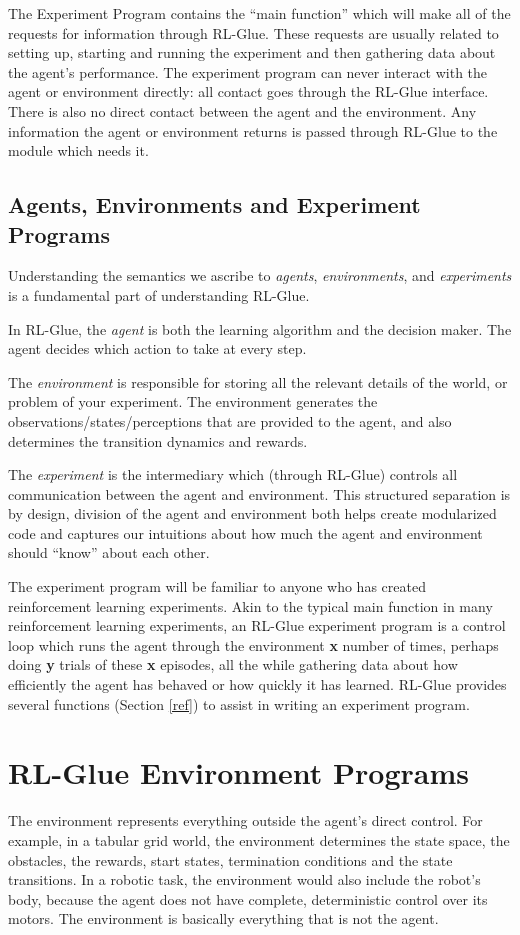 \documentclass[11pt]{article}
\begin{document}
The Experiment Program contains the ``main function'' which will make all of the requests for information through RL-Glue. These requests are usually related to setting up, starting and running the experiment and then gathering data about the agent's performance. The experiment program can never interact with the agent or environment directly: all contact goes through the RL-Glue interface.  There is also no direct contact between the agent and the environment. Any information the agent or environment returns is passed through RL-Glue to the module which needs it.  



\subsection{Agents, Environments and Experiment Programs}
Understanding the semantics we ascribe to \textit{agents}, \textit{environments}, and \textit{experiments} is a fundamental part of understanding RL-Glue.

In RL-Glue, the \textit{agent} is both the learning algorithm and the decision maker. The agent decides which action to take at every step.

The \textit{environment} is responsible for storing all the relevant details of the world, or problem of your experiment. The environment generates the observations/states/perceptions that are provided to the agent, and also determines the transition dynamics and rewards.  

The \textit{experiment} is the intermediary which (through RL-Glue) controls all communication between the agent and environment.  This structured separation is by design, division of the agent and environment both helps create modularized code and captures our intuitions about how much the agent and environment should ``know'' about each other.

The experiment program will be familiar to anyone who has created reinforcement learning experiments. Akin to the typical main function in many reinforcement learning experiments, an RL-Glue experiment program is a control loop which runs the agent through the environment {\bf x} number of times, perhaps doing {\bf y} trials of these {\bf x} episodes, all the while gathering data about how efficiently the agent has behaved or how quickly it has learned. RL-Glue provides several functions (Section \ref{ref}) to assist in writing an experiment program.



\section{RL-Glue Environment Programs}
\label{env}
The environment represents everything outside the agent's direct control. For example, in a tabular grid world, the environment determines the state space, the obstacles, the rewards, start states, termination conditions and the state transitions.  In a robotic task, the environment would also include the robot's body, because the agent does not have complete, deterministic control over its motors. The environment is basically everything that is not the agent.
\end{document}
